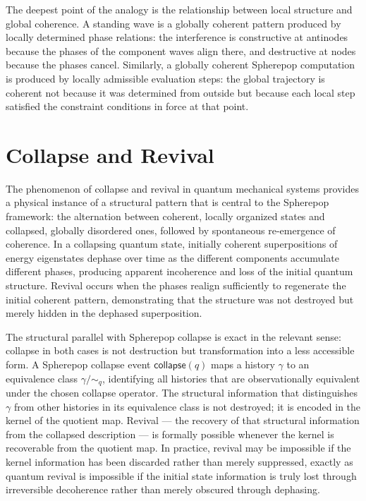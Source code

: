 \documentclass[12pt,openany]{book}
\theoremstyle{plain}
\theoremstyle{definition}
\theoremstyle{remark}
\newcommand{\scollapse}[1]{\mathsf{collapse}\!\left(#1\right)}
\begin{document}
The deepest point of the analogy is the relationship between local structure and global coherence. A standing wave is a globally coherent pattern produced by locally determined phase relations: the interference is constructive at antinodes because the phases of the component waves align there, and destructive at nodes because the phases cancel. Similarly, a globally coherent Spherepop computation is produced by locally admissible evaluation steps: the global trajectory is coherent not because it was determined from outside but because each local step satisfied the constraint conditions in force at that point.

\section{Collapse and Revival}

The phenomenon of collapse and revival in quantum mechanical systems provides a physical instance of a structural pattern that is central to the Spherepop framework: the alternation between coherent, locally organized states and collapsed, globally disordered ones, followed by spontaneous re-emergence of coherence. In a collapsing quantum state, initially coherent superpositions of energy eigenstates dephase over time as the different components accumulate different phases, producing apparent incoherence and loss of the initial quantum structure. Revival occurs when the phases realign sufficiently to regenerate the initial coherent pattern, demonstrating that the structure was not destroyed but merely hidden in the dephased superposition.

The structural parallel with Spherepop collapse is exact in the relevant sense: collapse in both cases is not destruction but transformation into a less accessible form. A Spherepop collapse event $\scollapse{q}$ maps a history $\gamma$ to an equivalence class $\gamma/{\sim_q}$, identifying all histories that are observationally equivalent under the chosen collapse operator. The structural information that distinguishes $\gamma$ from other histories in its equivalence class is not destroyed; it is encoded in the kernel of the quotient map. Revival — the recovery of that structural information from the collapsed description — is formally possible whenever the kernel is recoverable from the quotient map. In practice, revival may be impossible if the kernel information has been discarded rather than merely suppressed, exactly as quantum revival is impossible if the initial state information is truly lost through irreversible decoherence rather than merely obscured through dephasing.
\end{document}

